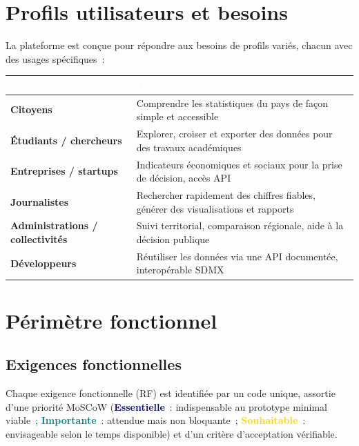 \documentclass[11pt,a4paper]{article}
\newcommand{\priE}{\textcolor{navy}{\bfseries Essentielle}}
\newcommand{\priI}{\textcolor{teal}{\bfseries Importante}}
\newcommand{\priS}{\textcolor{gold}{\bfseries Souhaitable}}
\begin{document}
\section{Profils utilisateurs et besoins}

La plateforme est conçue pour répondre aux besoins de profils variés, chacun avec des usages spécifiques~:

\begin{longtable}{@{}>{\bfseries}p{4.2cm} p{10.3cm}@{}}
\rowcolor{navy}
\textcolor{white}{Profil} & \textcolor{white}{Besoins principaux} \\
\endhead
Citoyens & Comprendre les statistiques du pays de façon simple et accessible \\
Étudiants / chercheurs & Explorer, croiser et exporter des données pour des travaux académiques \\
Entreprises / startups & Indicateurs économiques et sociaux pour la prise de décision, accès API \\
Journalistes & Rechercher rapidement des chiffres fiables, générer des visualisations et rapports \\
Administrations / collectivités & Suivi territorial, comparaison régionale, aide à la décision publique \\
Développeurs & Réutiliser les données via une API documentée, interopérable SDMX \\
\end{longtable}

\section{Périmètre fonctionnel}

\subsection{Exigences fonctionnelles}

Chaque exigence fonctionnelle (RF) est identifiée par un code unique, assortie d'une priorité MoSCoW (\priE~: indispensable au prototype minimal viable~; \priI~: attendue mais non bloquante~; \priS~: envisageable selon le temps disponible) et d'un critère d'acceptation vérifiable.
\end{document}
